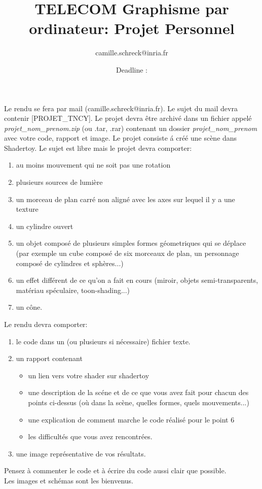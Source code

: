 \documentclass{article}
\date{Deadline : \displaydate{date}}
\title{TELECOM Graphisme par ordinateur: Projet Personnel}
\author{camille.schreck@inria.fr}
\begin{document}
\maketitle

Le rendu se fera par mail (camille.schreck@inria.fr). Le sujet du mail devra contenir [PROJET\_TNCY]. Le projet devra \^etre archiv\'e dans un fichier appel\'e \emph{projet\_nom\_prenom.zip} (ou .tar, .rar) contenant un dossier \emph{projet\_nom\_prenom} avec votre code, rapport et image.\newline
\newline
Le projet consiste \'a cr\'e\'e une sc\`ene dans Shadertoy.
Le sujet est libre mais le projet devra comporter:
\begin{enumerate}
\item au moins mouvement qui ne soit pas une rotation
\item plusieurs sources de lumi\`ere
\item un morceau de plan carr\'e non align\'e avec les axes sur lequel il y a une texture
\item un cylindre ouvert
\item un objet composé de plusieurs simples formes géometriques qui se d\'eplace (par exemple un cube compos\'e de six morceaux de plan, un personnage compos\'e de cylindres et sph\`eres...)
\item un effet diff\'erent de ce qu'on a fait en cours (miroir, objets semi-transparents, mat\'eriau sp\'eculaire, toon-shading...)
\item un c\^one.
\end{enumerate}
\vspace{1cm}
Le rendu devra comporter:
\begin{enumerate}
\item le code dans un (ou plusieurs si n\'ecessaire) fichier texte.
\item un rapport contenant
  \begin{itemize}
  \item un lien vers votre shader sur shadertoy
  \item une description de la sc\'ene et de ce que vous avez fait pour chacun des points ci-dessus (o\`u dans la sc\`ene, quelles formes, quels mouvements...)
  \item une explication de comment marche le code r\'ealis\'e pour le point 6
  \item les difficultés que vous avez rencontr\'ees.
  \end{itemize}
\item une image repr\'esentative de vos r\'esultats.
\end{enumerate}
Pensez \`a commenter le code et \`a \'ecrire du code aussi clair que possible.\\
Les images et sch\'emas sont les bienvenus.\\
\end{document}
